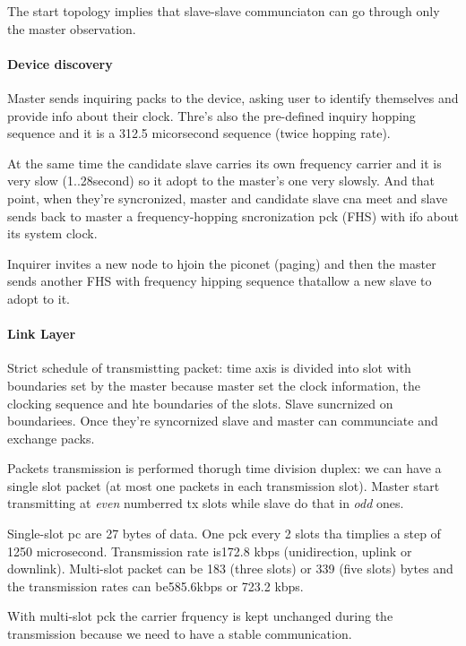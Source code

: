 The start topology implies that slave-slave communciaton can go through only the master observation. 

\paragraph{Device discovery}
Master sends inquiring packs to the device, asking user to identify themselves and provide info about their clock. Thre's also the pre-defined inquiry hopping sequence and it is a 312.5 micorsecond sequence (twice hopping rate).

At the same time the candidate slave carries its own frequency carrier and it is very slow (1..28second) so it adopt to the master's one very slowsly. 
And that point, when they're syncronized, master and candidate slave cna meet and slave sends back to master a frequency-hopping sncronization pck (FHS) with ifo about its system clock. 

Inquirer invites a new node to hjoin the piconet (paging) and then the master sends another FHS with frequency hipping sequence thatallow a new slave to adopt to it. 

\paragraph{Link Layer}
Strict schedule of transmistting packet: time axis is divided into slot with boundaries set by the master because master set the clock information, the clocking sequence and hte boundaries of the slots. 
Slave suncrnized on boundariees. Once they're syncornized slave and master can communciate and exchange packs.

Packets transmission is performed thorugh time division duplex: we can have a single slot packet (at most one packets in each transmission slot). Master start transmitting at \emph{even} numberred tx slots while slave do that in \emph{odd} ones. 

Single-slot pc are 27 bytes of data. One pck every 2 slots tha timplies a step of 1250 microsecond. Transmission rate is172.8 kbps (unidirection, uplink or downlink). Multi-slot packet can be 183 (three slots) or 339 (five slots) bytes and the transmission rates can be585.6kbps or 723.2 kbps. 

With multi-slot pck the carrier frquency is kept unchanged during the transmission because we need to have a stable communication. 

